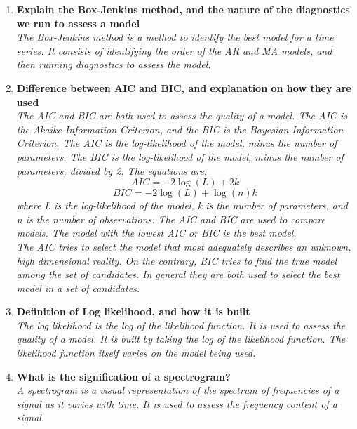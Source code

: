 \documentclass{article}
\begin{document}
\begin{enumerate}
    \item \textbf{Explain the Box-Jenkins method, and the nature of the diagnostics we run to assess a model} \\
    \textit{The Box-Jenkins method is a method to identify the best model for a time series. It consists of identifying the order of the AR and MA models, and then running diagnostics to assess the model.} \\
    \item \textbf{Difference between AIC and BIC, and explanation on how they are used} \\
    \textit{The AIC and BIC are both used to assess the quality of a model. The AIC is the Akaike Information Criterion, and the BIC is the Bayesian Information Criterion. The AIC is the log-likelihood of the model, minus the number of parameters. The BIC is the log-likelihood of the model, minus the number of parameters, divided by 2. The equations are:} \\
    \begin{equation}
        AIC = -2 \log(L) + 2k
    \end{equation}
    \begin{equation}
        BIC = -2 \log(L) + \log(n)k
    \end{equation}
    \textit{where L is the log-likelihood of the model, k is the number of parameters, and n is the number of observations. The AIC and BIC are used to compare models. The model with the lowest AIC or BIC is the best model.} \\
    \textit{The AIC tries to select the model that most adequately describes an unknown, high dimensional reality. On the contrary, BIC tries to find the true model among the set of candidates. In general they are both used to select the best model in a set of candidates.} \\
    \item \textbf{Definition of Log likelihood, and how it is built} \\
    \textit{The log likelihood is the log of the likelihood function. It is used to assess the quality of a model. It is built by taking the log of the likelihood function. The likelihood function itself varies on the model being used.} \\
    \item \textbf{What is the signification of a spectrogram?} \\
    \textit{A spectrogram is a visual representation of the spectrum of frequencies of a signal as it varies with time. It is used to assess the frequency content of a signal.} \\

\end{enumerate}
\end{document}
